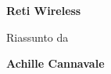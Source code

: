 \documentclass[titlepage, twoside]{book}
\begin{document}
\begin{titlepage}
\centering

 \vspace*{\fill}
    {\Huge\bfseries
Reti Wireless\par
}
\vspace{6ex}
{\Large
Riassunto da
\par}

        \vspace{1.5cm}
            
        \textbf{\large Achille Cannavale}
            
        \vfill

        \vspace{0.8cm}

   
\end{titlepage}
\Large

\tableofcontents








\end{document}

